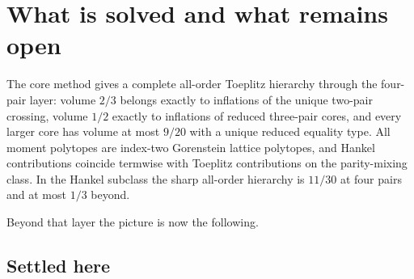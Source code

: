 %

\section{What is solved and what remains open}

The core method gives a complete all-order Toeplitz hierarchy through
the four-pair layer: volume $2/3$ belongs exactly to inflations of the
unique two-pair crossing, volume $1/2$ exactly to inflations of reduced
three-pair cores, and every larger core has volume at most $9/20$ with a
unique reduced equality type.  All moment polytopes are index-two
Gorenstein lattice polytopes, and Hankel contributions coincide
termwise with Toeplitz contributions on the parity-mixing class.  In the
Hankel subclass the sharp all-order hierarchy is $11/30$ at four pairs
and at most $1/3$ beyond.

Beyond that layer the picture is now the following.

\subsection*{Settled here}

